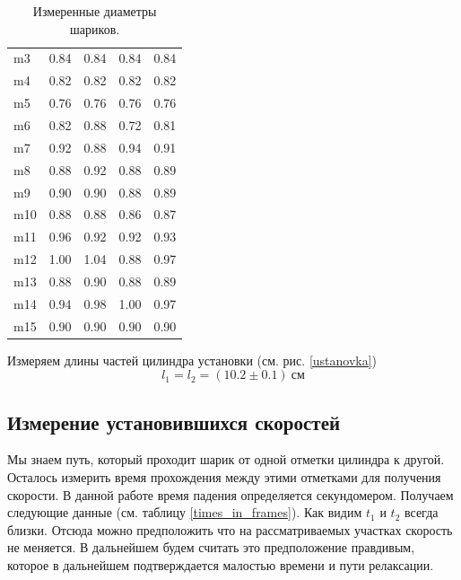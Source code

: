 \documentclass[a4paper, 12pt]{article}
\begin{document}
\begin{table}[h!]
\begin{center}
{\begin{tabular}{|l|rrr|r|}
                \hline
                m3  & 0.84  & 0.84  & 0.84  & 0.84                \\
                m4  & 0.82  & 0.82  & 0.82  & 0.82                \\
                m5  & 0.76  & 0.76  & 0.76  & 0.76                \\
                m6  & 0.82  & 0.88  & 0.72  & 0.81                \\
                m7  & 0.92  & 0.88  & 0.94  & 0.91                \\
                m8  & 0.88  & 0.92  & 0.88  & 0.89                \\
                m9  & 0.90  & 0.90  & 0.88  & 0.89                \\
                m10 & 0.88  & 0.88  & 0.86  & 0.87                \\
                m11 & 0.96  & 0.92  & 0.92  & 0.93                \\
                m12 & 1.00  & 1.04  & 0.88  & 0.97                \\
                m13 & 0.88  & 0.90  & 0.88  & 0.89                \\
                m14 & 0.94  & 0.98  & 1.00  & 0.97                \\
                m15 & 0.90  & 0.90  & 0.90  & 0.90                \\
                \hline
            \end{tabular}
        }

        \caption{Измеренные диаметры шариков.}
        \label{diams}
    \end{center}
\end{table}

Измеряем длины частей цилиндра установки (см. рис. \ref{ustanovka})
\begin{equation*} l_1=l_2=(10.2\pm0.1)\ \text{см} \end{equation*}

\subsection{Измерение установившихся скоростей} Мы знаем путь, который проходит
шарик от одной отметки цилиндра к другой. Осталось измерить время прохождения
между этими отметками для получения скорости. В данной работе время падения
определяется секундомером. Получаем следующие данные (см.
таблицу \ref{times_in_frames}). Как видим $t_1$ и $t_2$ всегда
близки. Отсюда можно предположить что на рассматриваемых участках скорость не
меняется. В дальнейшем будем считать это предположение правдивым, которое в
дальнейшем подтверждается малостью времени и пути релаксации.
\end{document}
